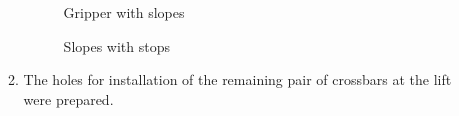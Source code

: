 \begin{enumerate}
\begin{enumerate}
      \begin{figure}[H]
      	\begin{minipage}[h]{0.47\linewidth}
      		\caption{Gripper with slopes}
      	\end{minipage}
      	\hfill
      	\begin{minipage}[h]{0.47\linewidth}
      		\caption{Slopes with stops}
      	\end{minipage}
      \end{figure}
      
      \item The holes for installation of the remaining pair of crossbars at the lift were prepared.
      
    \end{enumerate}
    

\end{enumerate}
